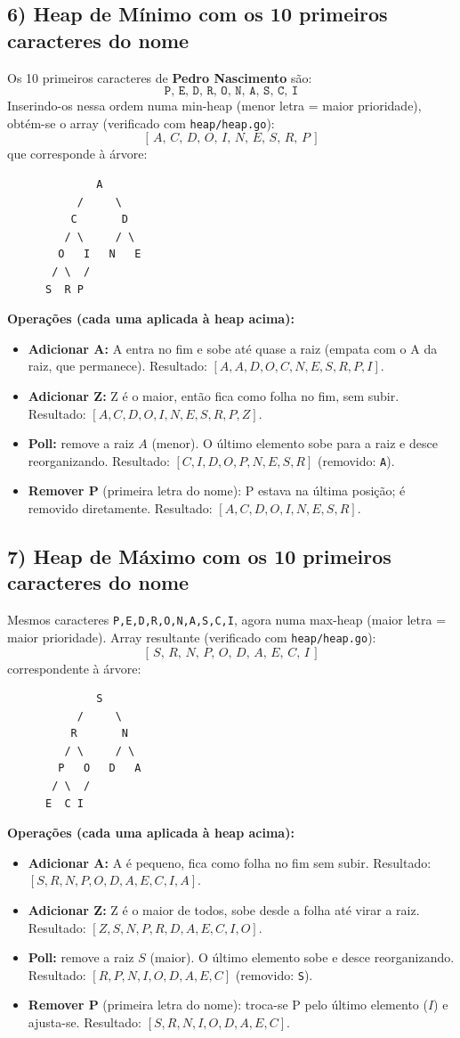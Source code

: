 \documentclass[11pt,a4paper]{article}
\begin{document}
\subsection*{6) Heap de Mínimo com os 10 primeiros caracteres do nome}
Os 10 primeiros caracteres de \textbf{Pedro Nascimento} são:
\[
  \texttt{P,\ E,\ D,\ R,\ O,\ N,\ A,\ S,\ C,\ I}
\]
Inserindo-os nessa ordem numa min-heap (menor letra = maior prioridade), obtém-se o array
(verificado com \texttt{heap/heap.go}):
\[
  [\,A,\,C,\,D,\,O,\,I,\,N,\,E,\,S,\,R,\,P\,]
\]
que corresponde à árvore:
\begin{Verbatim}
              A
           /     \
          C       D
         / \     / \
        O   I   N   E
       / \  /
      S  R P
\end{Verbatim}
\textbf{Operações (cada uma aplicada à heap acima):}
\begin{itemize}[noitemsep]
  \item \textbf{Adicionar A:} A entra no fim e sobe até quase a raiz (empata com o A da raiz, que
        permanece). Resultado: $[A,A,D,O,C,N,E,S,R,P,I]$.
  \item \textbf{Adicionar Z:} Z é o maior, então fica como folha no fim, sem subir.
        Resultado: $[A,C,D,O,I,N,E,S,R,P,Z]$.
  \item \textbf{Poll:} remove a raiz $A$ (menor). O último elemento sobe para a raiz e desce
        reorganizando. Resultado: $[C,I,D,O,P,N,E,S,R]$ (removido: \texttt{A}).
  \item \textbf{Remover P} (primeira letra do nome): P estava na última posição; é removido
        diretamente. Resultado: $[A,C,D,O,I,N,E,S,R]$.
\end{itemize}

\subsection*{7) Heap de Máximo com os 10 primeiros caracteres do nome}
Mesmos caracteres \texttt{P,E,D,R,O,N,A,S,C,I}, agora numa max-heap (maior letra = maior
prioridade). Array resultante (verificado com \texttt{heap/heap.go}):
\[
  [\,S,\,R,\,N,\,P,\,O,\,D,\,A,\,E,\,C,\,I\,]
\]
correspondente à árvore:
\begin{Verbatim}
              S
           /     \
          R       N
         / \     / \
        P   O   D   A
       / \  /
      E  C I
\end{Verbatim}
\textbf{Operações (cada uma aplicada à heap acima):}
\begin{itemize}[noitemsep]
  \item \textbf{Adicionar A:} A é pequeno, fica como folha no fim sem subir.
        Resultado: $[S,R,N,P,O,D,A,E,C,I,A]$.
  \item \textbf{Adicionar Z:} Z é o maior de todos, sobe desde a folha até virar a raiz.
        Resultado: $[Z,S,N,P,R,D,A,E,C,I,O]$.
  \item \textbf{Poll:} remove a raiz $S$ (maior). O último elemento sobe e desce reorganizando.
        Resultado: $[R,P,N,I,O,D,A,E,C]$ (removido: \texttt{S}).
  \item \textbf{Remover P} (primeira letra do nome): troca-se P pelo último elemento ($I$) e
        ajusta-se. Resultado: $[S,R,N,I,O,D,A,E,C]$.
\end{itemize}
\end{document}

